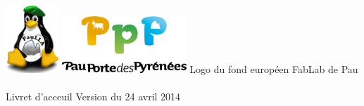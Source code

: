 \begin{center}
\includegraphics[width=0.15\textwidth]{paulla.png} \hfill
\includegraphics[width=0.35\textwidth]{PPP.png} \hfill
Logo du fond européen
\vfill
\Huge FabLab de Pau\\~\\
\huge Livret d'acceuil
\vfill
\footnotesize Version du 24 avril 2014
\end{center}
